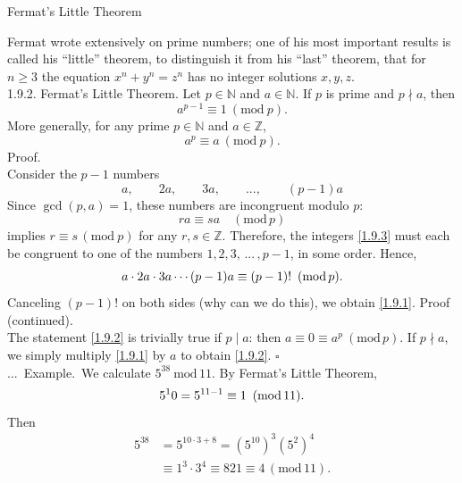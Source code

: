 \documentclass[smaller,hyperref={CJKbookmarks=true}]{beamer}
\newcommand{\N}{\mathbb{N}} \newcommand{\Z}{\mathbb{Z}} \newcommand{\Q}{\mathbb{Q}}
\newenvironment{PROOF}{{\noindent\!\sf\alert{Proof.}}\\}{\hfill$\square$\\}
\newcounter{zhuo}[subsection]
\renewcommand{\thezhuo}{\thesection.\thesubsection.\arabic{zhuo}}
\newenvironment{EXAMPLE}{\stepcounter{zhuo}\alert{\!\thezhuo.~Example.\,}}{}
\begin{document}
\begin{frame}{Fermat's Little Theorem}
\begin{spacing}{1.1}
Fermat wrote extensively on prime numbers; one of his most important
results is called his ``little'' theorem, to distinguish it from his ``last'' theorem, that for $n\geq3$ the equation $x^n+y^n=z^n$ has no integer solutions $x,y,z$.\\[5pt]
\alert{1.9.2. Fermat's Little Theorem.} Let $p\in\N$ and $a\in\N$. If $p$ is prime and $p\nmid a$, then
\setcounter{equation}{0}
\begin{equation}\label{1.9.1}
a^{p-1}\equiv1~(\text{mod}~p).
\end{equation}
More generally, for any prime $p\in\N$ and $a\in\Z$,
\begin{equation}\label{1.9.2}
a^p\equiv a~(\text{mod}~p).
\end{equation}
\newpage
\begin{PROOF}
Consider the $p-1$ numbers
\begin{equation}\label{1.9.3}
a,\qquad 2a,\qquad 3a,\quad\quad...,\qquad(p-1)a
\end{equation}
Since $\gcd(p,a)=1$, these numbers are incongruent modulo $p$:
\[ra\equiv sa\quad(\text{mod}\,p)\]
implies $r\equiv s\,(\text{mod}\:p)$ for any $r,s\in\Z$. Therefore, the integers \eqref{1.9.3} must each be congruent to one of the numbers $1,2,3,\,...\,,p-1$, in some order. Hence,
\[a\cdot 2a\cdot 3a\cdots(p-1)a\equiv (p-1)!\enskip(\text{mod}\,p).\]
Canceling $(p-1)!$ on both sides (why can we do this), we obtain \eqref{1.9.1}.
\newpage
\alert{Proof (continued).}\\
The statement \eqref{1.9.2} is trivially true if $p\mid a$: then $a\equiv0\equiv a^p~(\text{mod}\,p)$. If $p\nmid a$, we simply multiply \eqref{1.9.1} by $a$ to obtain \eqref{1.9.2}.
\end{PROOF}
\vspace*{16pt}
\begin{EXAMPLE}
We calculate $5^{38}~\text{mod}\,11$. By Fermat's Little Theorem,
\[5^10=5^{11-1}\equiv1\enskip(\text{mod}\,11).\]
Then
\begin{equation*}
  \begin{split}
     5^{38} &=5^{10\cdot3+8}=(5^{10})^3(5^2)^4 \\
       &\equiv1^3\cdot3^4\equiv 821\equiv4\,(\text{mod}\,11).
  \end{split}
\end{equation*}
\end{EXAMPLE}

\end{spacing}
\end{frame}
\end{document}
